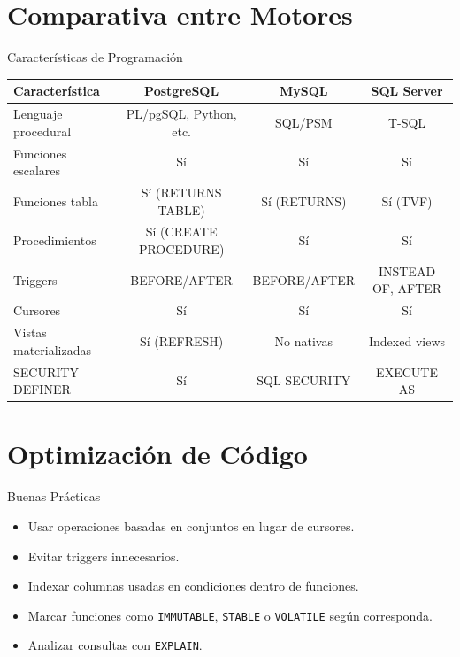 \documentclass[aspectratio=169, 10pt, xcolor=table]{beamer}
\begin{document}
\section{Comparativa entre Motores}

\begin{frame}{Características de Programación}
    \begin{table}
        \centering
        \begin{tabular}{l|c|c|c}
            \toprule
            Característica & PostgreSQL & MySQL & SQL Server \\
            \midrule
            Lenguaje procedural & PL/pgSQL, Python, etc. & SQL/PSM & T-SQL \\
            Funciones escalares & Sí & Sí & Sí \\
            Funciones tabla & Sí (RETURNS TABLE) & Sí (RETURNS) & Sí (TVF) \\
            Procedimientos & Sí (CREATE PROCEDURE) & Sí & Sí \\
            Triggers & BEFORE/AFTER & BEFORE/AFTER & INSTEAD OF, AFTER \\
            Cursores & Sí & Sí & Sí \\
            Vistas materializadas & Sí (REFRESH) & No nativas & Indexed views \\
            SECURITY DEFINER & Sí & SQL SECURITY & EXECUTE AS \\
            \bottomrule
        \end{tabular}
    \end{table}
\end{frame}

\section{Optimización de Código}

\begin{frame}{Buenas Prácticas}
    \begin{itemize}
        \item Usar operaciones basadas en conjuntos en lugar de cursores.
        \item Evitar triggers innecesarios.
        \item Indexar columnas usadas en condiciones dentro de funciones.
        \item Marcar funciones como \texttt{IMMUTABLE}, \texttt{STABLE} o \texttt{VOLATILE} según corresponda.
        \item Analizar consultas con \texttt{EXPLAIN}.
    \end{itemize}
\end{frame}
\end{document}
